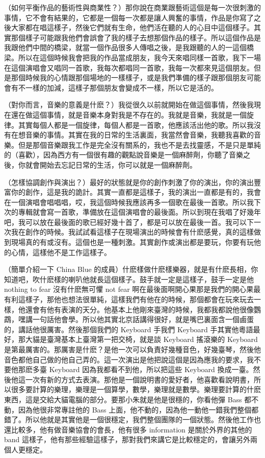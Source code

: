 \documentclass[UTF8,a4paper,oneside,twocolumn,12pt]{ctexbook}
\begin{document}
（如何平衡作品的藝術性與商業性？）那你說在商業跟藝術這個是每一次很刺激的事情，它不會有結果的，它都是一個每一次都是讓人興奮的事情，作品是你寫了之後大家都在唱這樣子，然後它們就有生命，他們活在聽的人的心目中這個樣子。其實那個樣子可能跟我他們會誤會了我的樣子去想那個作品的樣子。所以這個作品是我跟他們中間的橋梁，就當一個作品很多人傳唱之後，是我跟聽的人的一這個橋梁。所以在這個時候我會把我的作品當成朋友，我今天來唱同樣一首歌，我下一場在這個演唱會又唱同一首歌，我每次都唱同一首歌，我每一次都來見這個朋友。但是那個時候我的心情跟那個場地的一樣樣子，或是我們準備的樣子跟那個朋友可能會有不一樣的加減，這樣子那個朋友會變成不一樣，所以它是活的。

（對你而言，音樂的意義是什麽？）我從很久以前就開始在做這個事情，然後我現在還在做這個事情，就是音樂本身對我是不存在的。我就是音樂，我就是一個旋律。其實每個人都是一個旋律，每個人都是一首歌，他應該活出他的歌。所以我沒有在想音樂的事情。其實在我的日常的生活裏面，我當然會音樂，我聽我喜歡的音樂。但是那個音樂跟我工作是完全沒有關系的，我也不是去找靈感，不是只是單純的（喜歡），因為西方有一個很有趣的觀點說音樂是一個麻醉劑，你聽了音樂之後，你就會開始去忘記日常的生活，你可以就是一個麻醉劑。

（怎樣協調創作與演出？）最好的狀態就是你的創作刺激了你的演出，你的演出豐富你的創作，這是我的詭計。其實一直都是這樣子，我的演出一直都是有的，我會在一個演唱會唱唱唱，哎，我這個時候我應該再多一個歌在最後一首歌。所以我下次的專輯就會寫一首歌，準備放在這個演唱會的最後面。所以到現在我唱了好幾年吧，我可以放在最後面的歌已經好幾十首了，都是可以放在最後一首。我可以下一次我在創作的時候。我試試看這樣子在現場演出的時候會有什麽感覺，真的這樣做到現場真的有或沒有。這個也是一種刺激。其實創作或演出都是要玩，你要有玩他的心情，這樣他不是工作這樣子。

（簡單介紹一下 China Blue 的成員）什麽樣做什麽樣樂器，就是有什麽長相，你知道吧，吹什麽樣的喇叭他就長這個樣子。鼓手就一定是這樣子，鼓手一定是他 nothing to fear 沒有什麽無可懼 not fear 啊在最後面啊開心果那是我們的開心果最有利這樣子，那他也想法很單純，這樣我們有他在的時候，那個都會在玩來玩去一樣，他還會有他有表演的天分。他基本上他剛來臺灣的時候，我都我都說他很像鸚鵡，嘿講一句話他會學。所以他其實北京話講得很好，就是嘴巴裏面含一個鹵蛋的，講話他很厲害。然後那個我們的 Keyboard 手我們 Keyboard 手其實他粵語最好，那大貓是臺灣基本上臺灣第一把交椅，就是談 Keyboard 搖滾樂的 Keyboard 是第最厲害的。那厲害是什麽？是他一次可以負責好幾種音色，好幾臺琴，然後他音色都他自己做的他自己弄的。這一次演出是他把說這個是因為應我的要求，我不要他那麽多臺 Keyboard 因為我都看不到他，所以把這些 Keyboard 換成一臺。然後他這一次有新的方式去表演。那他是一個說明書的愛好者，他喜歡看說明書，所以很多要計算的樂理，樂理是一個算學，數學，樂理就是數學。樂理要計算的什麽東西，這是交給大貓電腦的部分。要那小朱就是他是很穩的，你看他彈 Bass 都不動，因為他很非常專註他的 Bass 上面，他不動的，因為他一動他一錯我們整個都錯了。所以他就是其實他是一個很穩定，我們整個團隊的一個狀態。然後他工作也還比較多，他有做音樂協會的會長，他有很多 information 是關於外界的其他的 band 這樣子，他有那些經驗這樣子，那對我們來講它是比較穩定的，會讓另外兩個人更穩定。
\end{document}
